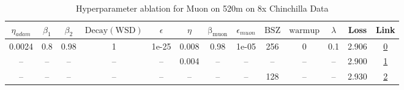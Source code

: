 \begin{table}[H]
\centering
\caption{Hyperparameter ablation for Muon on 520m on 8x Chinchilla Data}
\label{tab:ablation_muon_520m_8}
\begin{tabular}{ccccccccccccc}
\toprule
$\eta_{adam}$ & $\beta_1$ & $\beta_2$ & $\mathrm{Decay (WSD)}$ & $\epsilon$ & $\eta$ & $\mathrm{\beta_{muon}}$ & $\epsilon_{muon}$ & $\mathrm{BSZ}$ & $\mathrm{warmup}$ & $\lambda$ & Loss & Link \\
\midrule
0.0024 & 0.8 & 0.98 & 1 & 1e-25 & 0.008 & 0.98 & 1e-05 & 256 & 0 & 0.1 & 2.906 & \href{https://wandb.ai/stanford-mercury/optimizer-scaling/runs/sweep-520m-85B-muongc58c06lr0.008-wd0.1-minlr0-warmup0-b10.8-b20-498482}{0} \\
\midrule
-- & -- & -- & -- & -- & 0.004 & -- & -- & -- & -- & -- & 2.900 & \href{https://wandb.ai/stanford-mercury/optimizer-scaling/runs/sweep-520m-85B-muong0ea950lr0.004-wd0.1-minlr0-warmup0-b10.8-b20-9ac240}{1} \\
-- & -- & -- & -- & -- & -- & -- & -- & 128 & -- & -- & 2.930 & \href{https://wandb.ai/stanford-mercury/optimizer-scaling/runs/sweep-520m-85B-muong1d8a02lr0.008-wd0.1-minlr0-warmup0-b10.8-b20-913852}{2} \\
\bottomrule
\end{tabular}
\end{table}

